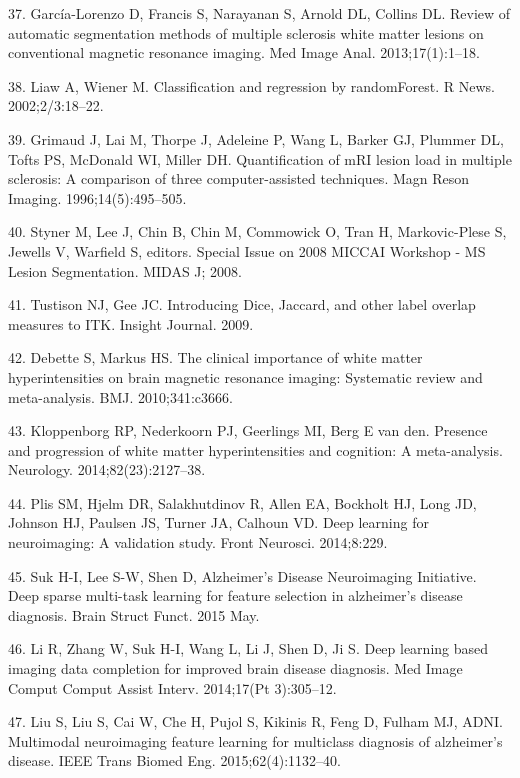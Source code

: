 \documentclass[11pt,]{article}
\begin{document}
\hypertarget{ref-Garcia-Lorenzo:2013aa}{}
37. García-Lorenzo D, Francis S, Narayanan S, Arnold DL, Collins DL.
Review of automatic segmentation methods of multiple sclerosis white
matter lesions on conventional magnetic resonance imaging. Med Image
Anal. 2013;17(1):1--18.

\hypertarget{ref-liaw2002}{}
38. Liaw A, Wiener M. Classification and regression by randomForest. R
News. 2002;2/3:18--22.

\hypertarget{ref-Grimaud:1996aa}{}
39. Grimaud J, Lai M, Thorpe J, Adeleine P, Wang L, Barker GJ, Plummer
DL, Tofts PS, McDonald WI, Miller DH. Quantification of mRI lesion load
in multiple sclerosis: A comparison of three computer-assisted
techniques. Magn Reson Imaging. 1996;14(5):495--505.

\hypertarget{ref-styner2008}{}
40. Styner M, Lee J, Chin B, Chin M, Commowick O, Tran H, Markovic-Plese
S, Jewells V, Warfield S, editors. Special Issue on 2008 MICCAI Workshop
- MS Lesion Segmentation. MIDAS J; 2008.

\hypertarget{ref-tustison2009}{}
41. Tustison NJ, Gee JC. Introducing Dice, Jaccard, and other label
overlap measures to ITK. Insight Journal. 2009.

\hypertarget{ref-Debette:2010aa}{}
42. Debette S, Markus HS. The clinical importance of white matter
hyperintensities on brain magnetic resonance imaging: Systematic review
and meta-analysis. BMJ. 2010;341:c3666.

\hypertarget{ref-Kloppenborg:2014aa}{}
43. Kloppenborg RP, Nederkoorn PJ, Geerlings MI, Berg E van den.
Presence and progression of white matter hyperintensities and cognition:
A meta-analysis. Neurology. 2014;82(23):2127--38.

\hypertarget{ref-Plis:2014aa}{}
44. Plis SM, Hjelm DR, Salakhutdinov R, Allen EA, Bockholt HJ, Long JD,
Johnson HJ, Paulsen JS, Turner JA, Calhoun VD. Deep learning for
neuroimaging: A validation study. Front Neurosci. 2014;8:229.

\hypertarget{ref-Suk:2015aa}{}
45. Suk H-I, Lee S-W, Shen D, Alzheimer's Disease Neuroimaging
Initiative. Deep sparse multi-task learning for feature selection in
alzheimer's disease diagnosis. Brain Struct Funct. 2015 May.

\hypertarget{ref-Li:2014aa}{}
46. Li R, Zhang W, Suk H-I, Wang L, Li J, Shen D, Ji S. Deep learning
based imaging data completion for improved brain disease diagnosis. Med
Image Comput Comput Assist Interv. 2014;17(Pt 3):305--12.

\hypertarget{ref-Liu:2015aa}{}
47. Liu S, Liu S, Cai W, Che H, Pujol S, Kikinis R, Feng D, Fulham MJ,
ADNI. Multimodal neuroimaging feature learning for multiclass diagnosis
of alzheimer's disease. IEEE Trans Biomed Eng. 2015;62(4):1132--40.
\end{document}
